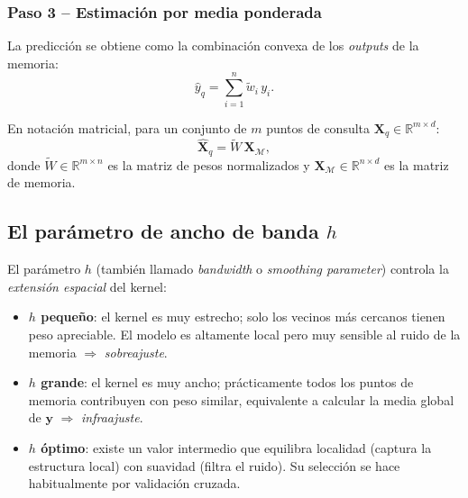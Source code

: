\documentclass[12pt,a4paper]{article}
\begin{document}
\subsubsection{Paso 3 -- Estimaci\'on por media ponderada}

La predicci\'on se obtiene como la combinaci\'on convexa de los \emph{outputs} de la
memoria:
\begin{equation}\label{eq:pred}
  \hat{y}_q = \sum_{i=1}^{n} \tilde{w}_i \, y_i.
\end{equation}

En notaci\'on matricial, para un conjunto de $m$ puntos de consulta
$\mathbf{X}_q \in \mathbb{R}^{m \times d}$:
\begin{equation}\label{eq:matrix}
  \hat{\mathbf{X}}_q = \tilde{W}\,\mathbf{X}_{\mathcal{M}},
\end{equation}
donde $\tilde{W} \in \mathbb{R}^{m \times n}$ es la matriz de pesos normalizados y
$\mathbf{X}_{\mathcal{M}} \in \mathbb{R}^{n \times d}$ es la matriz de memoria.

\subsection{El par\'ametro de ancho de banda $h$}

El par\'ametro $h$ (tambi\'en llamado \emph{bandwidth} o \emph{smoothing parameter})
controla la \emph{extensi\'on espacial} del kernel:

\begin{itemize}[leftmargin=2em]
  \item \textbf{$h$ peque\~no}: el kernel es muy estrecho; solo los vecinos m\'as
        cercanos tienen peso apreciable. El modelo es altamente local pero muy
        sensible al ruido de la memoria $\Rightarrow$ \emph{sobreajuste}.
  \item \textbf{$h$ grande}: el kernel es muy ancho; pr\'acticamente todos los
        puntos de memoria contribuyen con peso similar, equivalente a calcular la
        media global de $\mathbf{y}$ $\Rightarrow$ \emph{infraajuste}.
  \item \textbf{$h$ \'optimo}: existe un valor intermedio que equilibra localidad
        (captura la estructura local) con suavidad (filtra el ruido). Su
        selecci\'on se hace habitualmente por validaci\'on cruzada.
\end{itemize}
\end{document}
